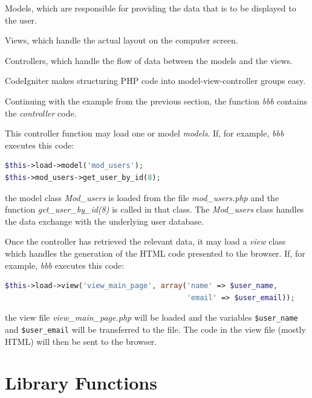 \documentclass[11pt,oneside,a4paper]{memoir}
\begin{document}
\begin{list}{-}{%
    \setlength{\itemsep}{0pt}%
    \setlength{\parsep}{0pt}%
    \setlength{\topsep}{\baselineskip}%
    \setlength{\partopsep}{0pt}%
  }
  \item Models, which are responsible for providing the data that is to be displayed to the user.
  \item Views, which handle the actual layout on the computer screen.
  \item Controllers, which handle the flow of data between the models and the views.
\end{list}

CodeIgniter makes structuring PHP code into model-view-controller groups easy.

Continuing with the example from the previous section, the function \emph{bbb} contains the
\emph{controller} code.

This controller function may load one or model \emph{models}. If, for example, \emph{bbb}
executes this code:

\begin{lstlisting}[language=PHP]
$this->load->model('mod_users');
$this->mod_users->get_user_by_id(8);
\end{lstlisting}

\noindent
the model class \emph{Mod\_users} is loaded from the file \emph{mod\_users.php} and the function
\emph{get\_\-user\_\-by\_\-id(8)} is called in that class. The \emph{Mod\_users} class handles the data
exchange with the underlying user database.

Once the controller has retrieved the relevant data, it may load a \emph{view} class which handles
the generation of the HTML code presented to the browser. If, for example, \emph{bbb} executes
this code:

\begin{lstlisting}[language=PHP]
$this->load->view('view_main_page', array('name' => $user_name,
                                          'email' => $user_email));
\end{lstlisting}

\noindent
the view file \emph{view\_main\_page.php} will be loaded and the variables \texttt{\$user\_name} and
\texttt{\$user\_email} will be transferred to the file. The code in the view file (mostly HTML) will
then be sent to the browser.

\section{Library Functions}
\end{document}
